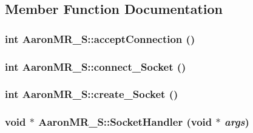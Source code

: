 \subsection{Member Function Documentation}
\hypertarget{classAaronMR__S_a5daabac4994c644a13360acdbadec63e}{
\subsubsection[{acceptConnection}]{\setlength{\rightskip}{0pt plus 5cm}int AaronMR\_\-S::acceptConnection ()}}
\label{classAaronMR__S_a5daabac4994c644a13360acdbadec63e}
\hypertarget{classAaronMR__S_a0eb15df9fca93e1007970755c4422f5b}{
\subsubsection[{connect\_\-Socket}]{\setlength{\rightskip}{0pt plus 5cm}int AaronMR\_\-S::connect\_\-Socket ()}}
\label{classAaronMR__S_a0eb15df9fca93e1007970755c4422f5b}
\hypertarget{classAaronMR__S_a978dc68a4d0326f3fe5972b788ceb2f7}{
\subsubsection[{create\_\-Socket}]{\setlength{\rightskip}{0pt plus 5cm}int AaronMR\_\-S::create\_\-Socket ()}}
\label{classAaronMR__S_a978dc68a4d0326f3fe5972b788ceb2f7}
\hypertarget{classAaronMR__S_ae8cc107d9d4a69cd9255c5246b7e3ae7}{
\subsubsection[{SocketHandler}]{\setlength{\rightskip}{0pt plus 5cm}void $\ast$ AaronMR\_\-S::SocketHandler (void $\ast$ {\em args})}}
\label{classAaronMR__S_ae8cc107d9d4a69cd9255c5246b7e3ae7}


